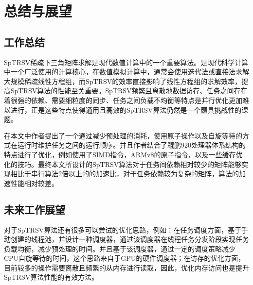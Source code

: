 \chapter{总结与展望}


\section{工作总结}

SpTRSV稀疏下三角矩阵求解是现代数值计算中的一个重要算法。是现代科学计算中一个广泛使用的计算核心，在数值模拟计算中，通常会使用迭代法或直接法求解大规模稀疏线性方程组，而SpTRSV的效率直接影响了线性方程组的求解效率，提高SpTRSV算法的性能至关重要。SpTRSV频繁且离散地数据访存、任务之间存在着很强的依赖、需要细粒度的同步、任务之间负载不均衡等特点是并行优化更加难以进行，正是这些特点使得通用且高效的SpTRSV算法仍然是一个颇具挑战性的课题。

在本文中作者提出了一个通过减少预处理的消耗，使用原子操作以及自旋等待的方式在运行时维护任务之间的运行顺序。并且作者结合了鲲鹏920处理器体系结构的特点进行了优化，例如使用了SIMD指令，ARMv8的原子指令，以及一些缓存优化的技巧。最终本文所设计的SpTRSV算法对于任务间依赖相对较少的矩阵能够实现相比于串行算法2倍以上的的加速比，对于任务依赖较为复杂的矩阵，算法的加速性能相对较差。


\section{未来工作展望}

对于SpTRSV算法还有很多可以尝试的优化思路，例如：在任务调度方面，基于手动创建的线程池，并设计一种调度器，通过该调度器在线程任务分发阶段实现任务负载均衡，减少预处理的时间。并且基于该调度器，通过一定的调度策略减少CPU自旋等待的时间，这个思路来自于GPU的硬件调度器；在访存的优化方面，目前较多的操作需要离散且频繁的从内存进行读取，因此，优化内存访问也是提升SpTRSV算法性能的有效方法。

\endinput